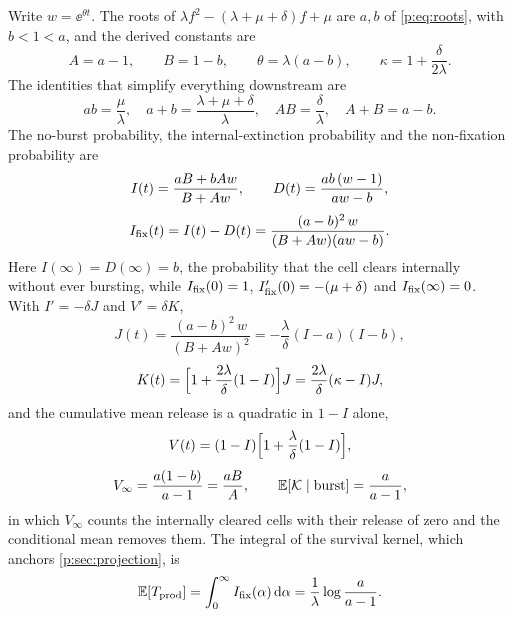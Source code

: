 Write $w=\ee^{\theta t}$. The roots of $\lambda f^2-(\lambda+\mu+\delta)f+\mu$
are $a,b$ of \cref{p:eq:roots}, with $b<1<a$, and the derived constants are
\begin{equation}
A=a-1,\qquad B=1-b,\qquad \theta=\lambda(a-b),\qquad
\kappa=1+\frac{\delta}{2\lambda}.
\label{p:eq:derived}
\end{equation}
The identities that simplify everything downstream are
\begin{equation}
ab=\frac{\mu}{\lambda},\quad a+b=\frac{\lambda+\mu+\delta}{\lambda},\quad
AB=\frac{\delta}{\lambda},\quad A+B=a-b.
\label{p:eq:AB}
\end{equation}
The no-burst probability, the internal-extinction probability and the
non-fixation probability are
\begin{equation}
\begin{gathered}
I(t)=\frac{aB+bAw}{B+Aw},\qquad
D(t)=\frac{ab\,(w-1)}{aw-b},\\[0.35em]
I_{\mathrm{fix}}(t)=I(t)-D(t)=\frac{(a-b)^2\,w}{(B+Aw)(aw-b)}.
\end{gathered}
\label{p:eq:IDIhat}
\end{equation}
Here $I(\infty)=D(\infty)=b$, the probability that the cell clears
internally without ever bursting, while $I_{\mathrm{fix}}(0)=1$,
$I_{\mathrm{fix}}'(0)=-(\mu+\delta)$ and $I_{\mathrm{fix}}(\infty)=0$. With $I'=-\delta J$ and
$V'=\delta K$,
\begin{equation}
J(t)=\frac{(a-b)^2\,w}{(B+Aw)^2}=-\frac{\lambda}{\delta}(I-a)(I-b),
\label{p:eq:J}
\end{equation}
\begin{equation}
K(t)=\Bigl[1+\frac{2\lambda}{\delta}(1-I)\Bigr]J
=\frac{2\lambda}{\delta}(\kappa-I)J,
\label{p:eq:K}
\end{equation}
and the cumulative mean release is a quadratic in $1-I$ alone,
\begin{equation}
\begin{gathered}
V(t)=(1-I)\Bigl[1+\frac{\lambda}{\delta}(1-I)\Bigr],\\[0.35em]
V_\infty=\frac{a(1-b)}{a-1}=\frac{aB}{A},
\qquad
\mathbb{E}\!\left[\mathcal{K}\mid\text{burst}\right]=\frac{a}{a-1},
\end{gathered}
\label{p:eq:V}
\end{equation}
in which $V_\infty$ counts the internally cleared cells with their release
of zero and the conditional mean removes them. The integral of the survival
kernel, which anchors \cref{p:sec:projection}, is
\begin{equation}
\mathbb{E}\!\left[T_{\rm prod}\right]=\int_0^\infty I_{\mathrm{fix}}(\alpha)\,\mathrm{d}\alpha
=\frac{1}{\lambda}\log\frac{a}{a-1}.
\label{p:eq:lifetime}
\end{equation}

